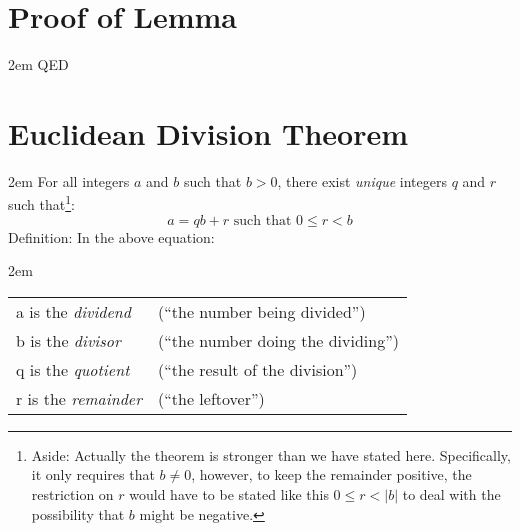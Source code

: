 \documentclass{article}
\newenvironment{jprIn}{\begin{adjustwidth}{2em}{}}{\end{adjustwidth}}
\begin{document}
\section*{Proof of Lemma}
\begin{jprIn}
QED
\end{jprIn}

\section*{Euclidean Division Theorem}
\begin{jprIn}
For all integers \(a\) and \(b\) such that \(b>0\),
there exist \emph{unique} integers \(q\) and \(r\) such that\footnote{Aside:
Actually the theorem is stronger than we have stated here.
Specifically, it only requires that \(b\ne0\), however,
to keep the remainder positive, the restriction on \(r\)
would have to be stated like
this \(0\le{}r<\left|b\right|\) to deal with
the possibility that \(b\) might be negative.}:
\[a=qb+r  \text{ such that } 0\le{}r<b\]
Definition: In the above equation:
\begin{jprIn}
\begin{tabular}{l l}
a is the \emph{dividend} & (``the number being divided'')\\
b is the \emph{divisor} & (``the number doing the dividing'')\\
q is the \emph{quotient} & (``the result of the division'')\\
r is the \emph{remainder} & (``the leftover'')
\end{tabular}
\end{jprIn}
\end{jprIn}
\end{document}
